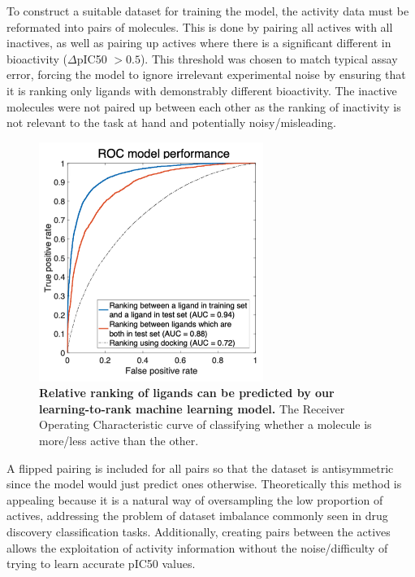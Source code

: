 To construct a suitable dataset for training the model, the activity data must be reformated into pairs of molecules. This is done by pairing all actives with all inactives, as well as pairing up actives where there is a significant different in bioactivity ($\Delta$pIC50 $>0.5$). This threshold was chosen to match typical assay error, forcing the model to ignore irrelevant experimental noise by ensuring that it is ranking only ligands with demonstrably different bioactivity. The inactive molecules were not paired up between each other as the ranking of inactivity is not relevant to the task at hand and potentially noisy/misleading.

\begin{figure}[!th]
    \centering
    \includegraphics[width=0.65\textwidth]{Chapters/Ranking/Figs/roc_curve.png}
    \caption{\textbf{Relative ranking of ligands can be predicted by our learning-to-rank machine learning model.} The Receiver Operating Characteristic curve of classifying whether a molecule is more/less active than the other.}
    \label{fig:roc_plot}
\end{figure}

A flipped pairing is included for all pairs so that the dataset is antisymmetric since the model would just predict ones otherwise. Theoretically this method is appealing because it is a natural way of oversampling the low proportion of actives, addressing the problem of dataset imbalance commonly seen in drug discovery classification tasks. Additionally, creating pairs between the actives allows the exploitation of activity information without the noise/difficulty of trying to learn accurate pIC50 values.

